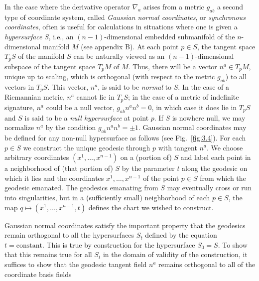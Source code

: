 In the case where the derivative operator $\nabla_a$ arises from a metric $g_{ab}$ a second type
of coordinate system, called \emph{Gaussian normal coordinates}, or \emph{synchronous coordinates}, often is useful for calculations in situations where one is given a \emph{hypersurface}
$S$, i.e., an $(n-1)$-dimensional embedded submanifold of the $n$-dimensional manifold $M$ (see appendix B). At each point $p\in S$, the tangent space $T_pS$ of the manifold
$S$ can be naturally viewed as an $(n-1)$-dimensional subspace of the tangent space
$T_pM$ of $M$. Thus, there will be a vector $n^a\in T_pM$, unique up to scaling, which is
orthogonal (with respect to the metric $g_{ab}$) to all vectors in $T_pS$. This vector, $n^a$, is said
to be \emph{normal} to $S$. In the case of a Riemannian metric, $n^a$ cannot lie in $T_pS$; in the case
of a metric of indefinite signature, $n^a$ could be a null vector, $g_{ab}n^an^b=0$, in which
case it does lie in $T_pS$ and $S$ is said to be a \emph{null hypersurface} at point $p$. If $S$ is nowhere
null, we may normalize $n^a$ by the condition $g_{ab}n^an^b=\pm1$. Gaussian normal coordinates may be defined for any non-null hypersurface as follows (see Fig.~\ref{fig:3.4}). For
each $p\in S$ we construct the unique geodesic through $p$ with tangent $n^a$. We choose
arbitrary coordinates $(x^1,\ldots,x^{n-1})$ on a (portion of) $S$ and label each point in a
neighborhood of (that portion of) $S$ by the parameter $t$ along the geodesic on which
it lies and the coordinates $x^1,\ldots,x^{n-1}$ of the point $p\in S$ from which the geodesic
emanated. The geodesics emanating from $S$ may eventually cross or run into singularities, but in a (sufficiently small) neighborhood of each $p\in S$, the map
$q\mapsto(x^1,\ldots,x^{n-1},t)$ defines the chart we wished to construct.

Gaussian normal coordinates satisfy the important property that the geodesics
remain orthogonal to all the hypersurfaces $S_t$ defined by the equation $t=\text{constant}$.
This is true by construction for the hypersurface $S_0=S$. To show that this remains
true for all $S_t$ in the domain of validity of the construction, it suffices to show that
the geodesic tangent field $n^a$ remains orthogonal to all of the coordinate basis fields



